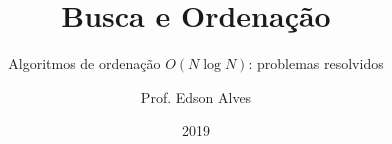 \title{Busca e Ordenação}
\subtitle{Algoritmos de ordenação $O(N\log N)$: problemas resolvidos}
\date{2019}
\author{Prof. Edson Alves}
